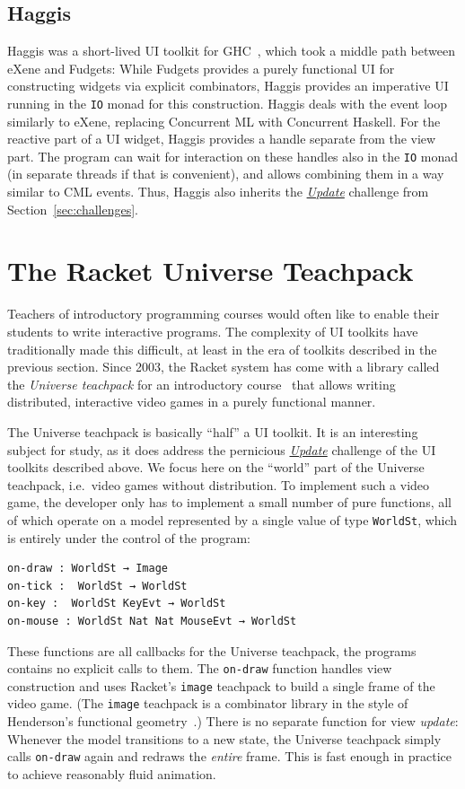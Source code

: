 \documentclass[sigplan,screen]{acmart}
\begin{document}
\subsection{Haggis}

Haggis was a short-lived UI toolkit for GHC~\cite{Haggis}, which took
a middle path between eXene and Fudgets: While Fudgets
provides a purely functional UI for constructing widgets via explicit
combinators, Haggis provides an imperative UI running in the
\texttt{IO} monad for this construction.  Haggis deals with the event
loop similarly to eXene, replacing Concurrent ML with Concurrent
Haskell.  For the reactive part of a UI widget, Haggis provides a
handle separate from the view part.  The program can wait for
interaction on these handles also in the \texttt{IO} monad (in
separate threads if that is convenient), and allows combining them in
a way similar to CML events.  Thus, Haggis also inherits the
\hyperlink{challenge:update}{\textit{Update}} challenge from Section~\ref{sec:challenges}.

\section{The Racket Universe Teachpack}
\label{sec:universe-teachpack}

Teachers of introductory programming courses would often like to
enable their students to write interactive programs.  The complexity
of UI toolkits have traditionally made this difficult, at least in the
era of toolkits described in the previous section.  Since 2003, the Racket system
 has come with a library called the \textit{Universe teachpack} for an
introductory course~\cite{UniverseTeachpack} that allows writing
distributed, interactive video games in a purely functional manner.

The Universe teachpack is basically ``half'' a UI toolkit.  It is an
interesting subject for study, as it does address the pernicious \hyperlink{challenge:update}{\textit{Update}}
challenge of the UI toolkits described above.  We focus
here on the ``world'' part of the Universe teachpack, i.e.\ video
games without distribution.  To implement such a video game, the
developer only has to implement a small number of pure functions, all
of which operate on a model represented by
a single value of type \texttt{WorldSt}, which is entirely under the
control of the program:
%
\begin{verbatim}
on-draw : WorldSt → Image
on-tick :  WorldSt → WorldSt
on-key :  WorldSt KeyEvt → WorldSt
on-mouse : WorldSt Nat Nat MouseEvt → WorldSt
\end{verbatim}
%
These functions are all callbacks for the Universe teachpack, the
programs contains no explicit calls to them.
The \texttt{on-draw} function handles view construction and uses Racket's
\texttt{image} teachpack to build a single frame of the video game.
(The \texttt{image} teachpack is a combinator library in the style of
Henderson's functional geometry~\cite{Henderson1982}.)  There is no
separate function for view \emph{update}: Whenever the model
transitions to a new state, the Universe teachpack simply calls
\texttt{on-draw} again and redraws the \emph{entire} frame.  This is
fast enough in practice to achieve reasonably fluid animation.
\end{document}
